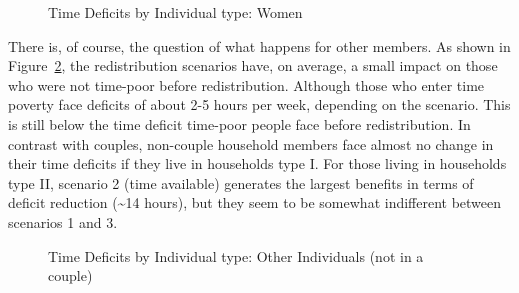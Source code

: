 \documentclass[
  11pt,
]{article}
\begin{document}
\begin{figure}[H]


\caption{\label{fig-def2}Time Deficits by Individual type: Women}

\end{figure}%

There is, of course, the question of what happens for other members. As
shown in Figure~\ref{fig-def3}, the redistribution scenarios have, on
average, a small impact on those who were not time-poor before
redistribution. Although those who enter time poverty face deficits of
about 2-5 hours per week, depending on the scenario. This is still below
the time deficit time-poor people face before redistribution. In
contrast with couples, non-couple household members face almost no
change in their time deficits if they live in households type I. For
those living in households type II, scenario 2 (time available)
generates the largest benefits in terms of deficit reduction
(\textasciitilde14 hours), but they seem to be somewhat indifferent
between scenarios 1 and 3.

\begin{figure}[H]


\caption{\label{fig-def3}Time Deficits by Individual type: Other
Individuals (not in a couple)}

\end{figure}%
\end{document}
